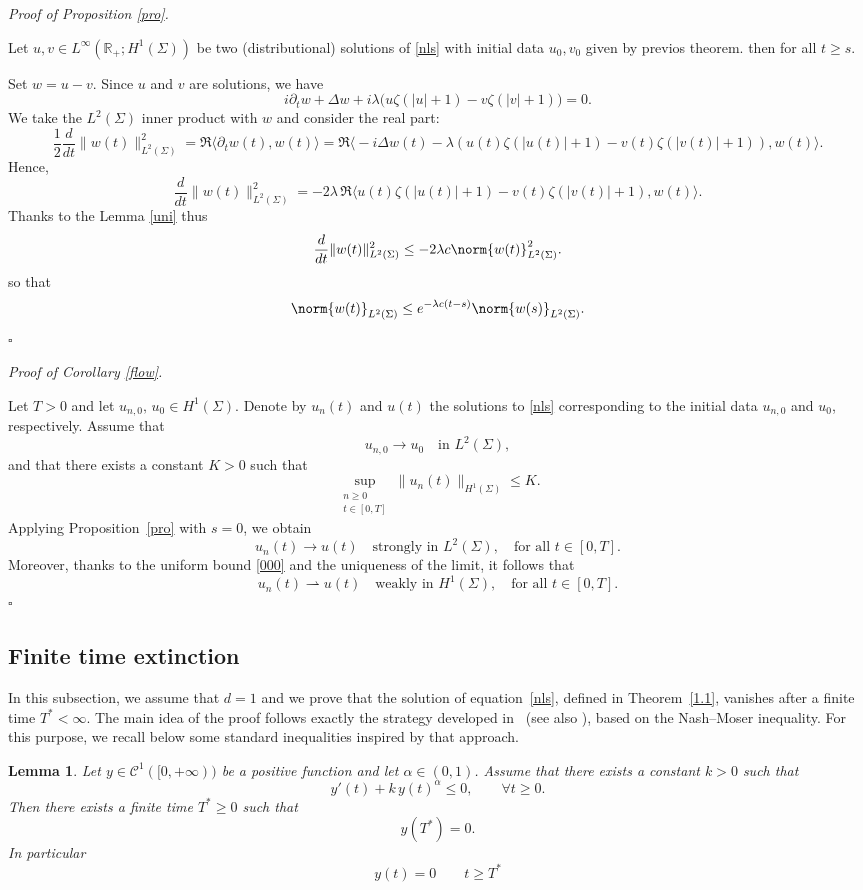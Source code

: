 \documentclass[10pt]{article}
\newtheorem{lemma}[theorem]{Lemma}
\renewenvironment{proof}[1][Proof]{%
  \noindent\textit{#1. }%
}{\hfill$\square$\vspace{4pt}}
\begin{document}
\begin{proof}[Proof of Proposition \ref{pro}]
     Let $u,v \in L^\infty(\mathbb{R}_+;H^1(\Sigma))$ be two (distributional) solutions of \eqref{nls} with initial data $u_0,v_0$ given by previos theorem. then for all $t\geq s$.

 Set $w = u - v$. Since $u$ and $v$ are solutions, we have
\[
i \partial_t w + \Delta w + i \lambda \big(u \zeta(|u|+1) - v \zeta(|v|+1)\big) = 0.
\]
We take the $L^2(\Sigma)$ inner product with $w$ and consider the real part:
\[
\frac{1}{2} \frac{d}{dt} \|w(t)\|_{L^2(\Sigma)}^2
= \Re \langle \partial_t w(t), w(t) \rangle
= \Re \big\langle -i \Delta w(t) - \lambda (u(t) \zeta(|u(t)|+1) - v(t) \zeta(|v(t)|+1)), w(t) \big\rangle.
\]
Hence,
\[
\frac{d}{dt} \|w(t)\|_{L^2(\Sigma)}^2
= -2 \lambda \, \Re \langle u(t) \zeta(|u(t)|+1) - v(t) \zeta(|v(t)|+1), w(t) \rangle.
\]
Thanks to the Lemma \ref{uni} thus $$\frac{d}{dt} \|w(t)\|_{L^2(\Sigma)}^2\leq -2\lambda c\norm{w(t)}_{L^2(\Sigma)}^2.$$ so  that $$\norm{w(t)}_{L^2(\Sigma)}\leq e^{-\lambda c(t-s)}\norm{w(s)}_{L^2(\Sigma)}.$$
\end{proof}

\begin{proof}[Proof of Corollary \ref{flow}]
Let $ T > 0 $ and let $ u_{n,0},\, u_0 \in H^1(\Sigma) $. Denote by $ u_n(t) $ and $ u(t) $ the solutions to \eqref{nls} corresponding to the initial data $ u_{n,0} $ and $ u_0 $, respectively.
Assume that
\[
u_{n,0} \longrightarrow u_0
\quad \text{in } L^2(\Sigma),
\]
and that there exists a constant $ K > 0 $ such that
\begin{equation}\label{000}
\sup_{\substack{n\geq 0 \\ t\in[0,T]}} \|u_n(t)\|_{H^1(\Sigma)} \le K.
\end{equation}
Applying Proposition~\ref{pro} with $ s = 0 $, we obtain
\[
u_n(t) \longrightarrow u(t)
\quad \text{strongly in } L^2(\Sigma),
\quad \text{for all } t \in [0,T].
\]
Moreover, thanks to the uniform bound \eqref{000} and the uniqueness of the limit, it follows that
\[
u_n(t) \rightharpoonup u(t)
\quad \text{weakly in } H^1(\Sigma),
\quad \text{for all } t \in [0,T].
\]
\end{proof}
\subsection{Finite time extinction}
In this subsection, we assume that $d=1$ and we prove that the solution of
equation~\eqref{nls}, defined in Theorem~\ref{1.1}, vanishes after a finite time
$T^*<\infty$. The main idea of the proof follows exactly the strategy developed
in~\cite{3} (see also \cite{10}), based on the Nash--Moser inequality. For this purpose, we recall
below some standard inequalities inspired by that approach.
\begin{lemma}\label{zero}
Let $y \in \mathcal{C}^1([0,+\infty))$ be a  positive function and let
$\alpha \in (0,1)$. 
Assume that there exists a constant $k>0$ such that
\[
y'(t) + k\, y(t)^{\alpha} \le 0, \qquad \forall t \ge 0.
\]
Then there exists a finite time $T^*\geq0$ such that
\[
y(T^*)=0.
\]
In particular $$y(t)=0 \qquad t \geq T^*$$
\end{lemma}
\end{document}
